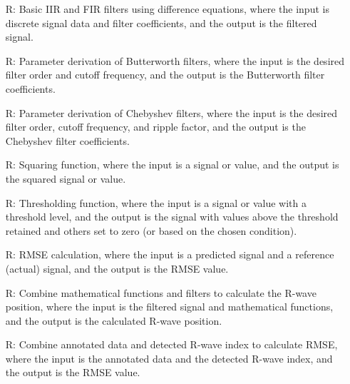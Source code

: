 \documentclass[12pt]{article}
\begin{document}
\noindent \begin{itemize}

\item[R\refstepcounter{reqnum}\thereqnum \label{R_basic_filters}:] Basic IIR and
FIR filters using difference equations, where the input is discrete signal data
and filter coefficients, and the output is the filtered signal.

\item[R\refstepcounter{reqnum}\thereqnum \label{R_Butterworth}:] Parameter
derivation of Butterworth filters, where the input is the desired filter order
and cutoff frequency, and the output is the Butterworth filter coefficients.

\item[R\refstepcounter{reqnum}\thereqnum \label{R_Chebyshev}:] Parameter
derivation of Chebyshev filters, where the input is the desired filter order,
cutoff frequency, and ripple factor, and the output is the Chebyshev filter
coefficients.

\item[R\refstepcounter{reqnum}\thereqnum \label{R_squaring}:] Squaring function,
where the input is a signal or value, and the output is the squared signal or
value.

\item[R\refstepcounter{reqnum}\thereqnum \label{R_thresholding}:] Thresholding
function, where the input is a signal or value with a threshold level, and the
output is the signal with values above the threshold retained and others set to
zero (or based on the chosen condition).

\item[R\refstepcounter{reqnum}\thereqnum \label{R_RMSE}:] RMSE calculation,
where the input is a predicted signal and a reference (actual) signal, and the
output is the RMSE value.

\item[R\refstepcounter{reqnum}\thereqnum \label{R_R_wave_position}:] Combine
mathematical functions and filters to calculate the R-wave position, where the
input is the filtered signal and mathematical functions, and the output is the
calculated R-wave position.

\item[R\refstepcounter{reqnum}\thereqnum \label{R_cal_RMSE}:] Combine annotated
data and detected R-wave index to calculate RMSE, where the input is the
annotated data and the detected R-wave index, and the output is the RMSE value.

\end{itemize}
\end{document}
